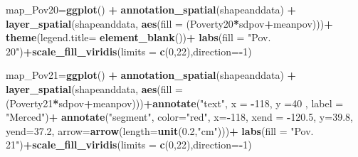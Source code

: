 \documentclass[
]{article}
\newenvironment{Shaded}{\begin{snugshade}}{\end{snugshade}}
\newcommand{\AttributeTok}[1]{\textcolor[rgb]{0.13,0.29,0.53}{#1}}
\newcommand{\DecValTok}[1]{\textcolor[rgb]{0.00,0.00,0.81}{#1}}
\newcommand{\FloatTok}[1]{\textcolor[rgb]{0.00,0.00,0.81}{#1}}
\newcommand{\FunctionTok}[1]{\textcolor[rgb]{0.13,0.29,0.53}{\textbf{#1}}}
\newcommand{\NormalTok}[1]{#1}
\newcommand{\OtherTok}[1]{\textcolor[rgb]{0.56,0.35,0.01}{#1}}
\newcommand{\SpecialCharTok}[1]{\textcolor[rgb]{0.81,0.36,0.00}{\textbf{#1}}}
\newcommand{\StringTok}[1]{\textcolor[rgb]{0.31,0.60,0.02}{#1}}
\begin{document}
\begin{Shaded}
\begin{Highlighting}[]
\NormalTok{map\_Pov20}\OtherTok{=}\FunctionTok{ggplot}\NormalTok{() }\SpecialCharTok{+}
  \FunctionTok{annotation\_spatial}\NormalTok{(shapeanddata) }\SpecialCharTok{+}
  \FunctionTok{layer\_spatial}\NormalTok{(shapeanddata, }\FunctionTok{aes}\NormalTok{(}\AttributeTok{fill =}\NormalTok{ (Poverty20}\SpecialCharTok{*}\NormalTok{sdpov}\SpecialCharTok{+}\NormalTok{meanpov)))}\SpecialCharTok{+}
  \FunctionTok{theme}\NormalTok{(}\AttributeTok{legend.title=} \FunctionTok{element\_blank}\NormalTok{())}\SpecialCharTok{+}
  \FunctionTok{labs}\NormalTok{(}\AttributeTok{fill =} \StringTok{"Pov. 20"}\NormalTok{)}\SpecialCharTok{+}\FunctionTok{scale\_fill\_viridis}\NormalTok{(}\AttributeTok{limits =} \FunctionTok{c}\NormalTok{(}\DecValTok{0}\NormalTok{,}\DecValTok{22}\NormalTok{),}\AttributeTok{direction=}\SpecialCharTok{{-}}\DecValTok{1}\NormalTok{)}
  


\NormalTok{map\_Pov21}\OtherTok{=}\FunctionTok{ggplot}\NormalTok{() }\SpecialCharTok{+}
  \FunctionTok{annotation\_spatial}\NormalTok{(shapeanddata) }\SpecialCharTok{+}
  \FunctionTok{layer\_spatial}\NormalTok{(shapeanddata, }\FunctionTok{aes}\NormalTok{(}\AttributeTok{fill =}\NormalTok{ (Poverty21}\SpecialCharTok{*}\NormalTok{sdpov}\SpecialCharTok{+}\NormalTok{meanpov)))}\SpecialCharTok{+}\FunctionTok{annotate}\NormalTok{(}\StringTok{"text"}\NormalTok{, }\AttributeTok{x =} \SpecialCharTok{{-}}\DecValTok{118}\NormalTok{, }\AttributeTok{y =}\DecValTok{40}\NormalTok{ , }\AttributeTok{label =} \StringTok{"Merced"}\NormalTok{)}\SpecialCharTok{+}
  \FunctionTok{annotate}\NormalTok{(}\StringTok{"segment"}\NormalTok{, }\AttributeTok{color=}\StringTok{"red"}\NormalTok{, }\AttributeTok{x=}\SpecialCharTok{{-}}\DecValTok{118}\NormalTok{, }\AttributeTok{xend =} \SpecialCharTok{{-}}\FloatTok{120.5}\NormalTok{, }
           \AttributeTok{y=}\FloatTok{39.8}\NormalTok{, }
           \AttributeTok{yend=}\FloatTok{37.2}\NormalTok{, }\AttributeTok{arrow=}\FunctionTok{arrow}\NormalTok{(}\AttributeTok{length=}\FunctionTok{unit}\NormalTok{(}\FloatTok{0.2}\NormalTok{,}\StringTok{"cm"}\NormalTok{)))}\SpecialCharTok{+}
  \FunctionTok{labs}\NormalTok{(}\AttributeTok{fill =} \StringTok{"Pov. 21"}\NormalTok{)}\SpecialCharTok{+}\FunctionTok{scale\_fill\_viridis}\NormalTok{(}\AttributeTok{limits =} \FunctionTok{c}\NormalTok{(}\DecValTok{0}\NormalTok{,}\DecValTok{22}\NormalTok{),}\AttributeTok{direction=}\SpecialCharTok{{-}}\DecValTok{1}\NormalTok{)}




\end{Highlighting}
\end{Shaded}
\end{document}
